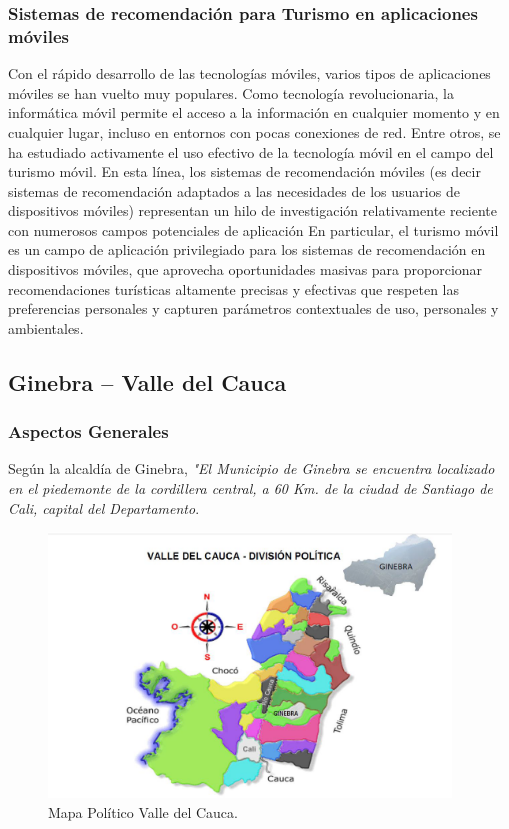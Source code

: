 \documentclass[12pt,letterpaper,openany]{book}
\begin{document}
\subsubsection{Sistemas de recomendación para Turismo en aplicaciones móviles}
Con el rápido desarrollo de las tecnologías móviles, varios tipos de aplicaciones móviles se han vuelto muy populares. Como tecnología revolucionaria, la informática móvil permite el acceso a la información en cualquier momento y en cualquier lugar, incluso en entornos con pocas conexiones de red. Entre otros, se ha estudiado activamente el uso efectivo de la tecnología móvil en el campo del turismo móvil. En esta línea, los sistemas de recomendación móviles (es decir sistemas de recomendación adaptados a las necesidades de los usuarios de dispositivos móviles) representan un hilo de investigación relativamente reciente con numerosos campos potenciales de aplicación  En particular, el turismo móvil es un campo de aplicación privilegiado para los sistemas de recomendación en dispositivos móviles, que aprovecha oportunidades masivas para proporcionar recomendaciones turísticas altamente precisas y efectivas que respeten las preferencias personales y capturen parámetros contextuales de uso, personales y ambientales\cite{16}. 

\subsection{Ginebra – Valle del Cauca}
\subsubsection{Aspectos Generales}
Según la alcaldía de Ginebra, \textit{"El Municipio de Ginebra se encuentra localizado en el piedemonte de la cordillera central, a 60 Km. de la ciudad de Santiago de Cali, capital del Departamento}.

\begin{figure}[H]
\begin{center}
\includegraphics[width=10.7cm]{./imagenes/mapa_politico}
\caption{Mapa Político Valle del Cauca.}
\end{center}
\end{figure}
\end{document}
